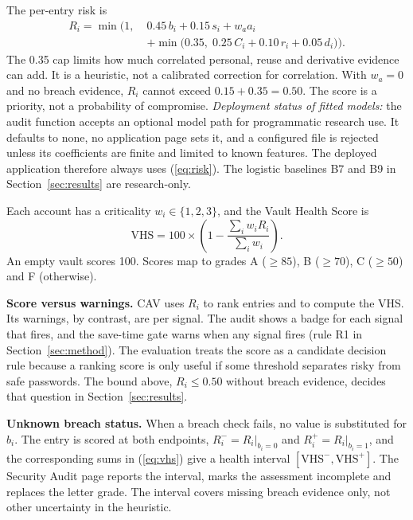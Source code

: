 \documentclass[preprint,12pt]{elsarticle}
\begin{document}
The per-entry risk is
\begin{align}
R_i=\min\!\Big(1,\;&0.45\,b_i+0.15\,s_i+w_a a_i\nonumber\\
&+\min\big(0.35,\;0.25\,C_i+0.10\,r_i+0.05\,d_i\big)\Big).
\label{eq:risk}
\end{align}
The 0.35 cap limits how much correlated personal, reuse and derivative evidence can add. It is a heuristic, not a calibrated correction for correlation. With $w_a=0$ and no breach evidence, $R_i$ cannot exceed $0.15+0.35=0.50$. The score is a priority, not a probability of compromise. \emph{Deployment status of fitted models:} the audit function accepts an optional model path for programmatic research use. It defaults to none, no application page sets it, and a configured file is rejected unless its coefficients are finite and limited to known features. The deployed application therefore always uses (\ref{eq:risk}). The logistic baselines B7 and B9 in Section~\ref{sec:results} are research-only.

Each account has a criticality $w_i\in\{1,2,3\}$, and the Vault Health Score is
\begin{equation}
\mathrm{VHS}=100\times\left(1-\frac{\sum_i w_i R_i}{\sum_i w_i}\right).
\label{eq:vhs}
\end{equation}
An empty vault scores 100. Scores map to grades A ($\geq 85$), B ($\geq 70$), C ($\geq 50$) and F (otherwise).

\textbf{Score versus warnings.} CAV uses $R_i$ to rank entries and to compute the VHS. Its warnings, by contrast, are per signal. The audit shows a badge for each signal that fires, and the save-time gate warns when any signal fires (rule R1 in Section~\ref{sec:method}). The evaluation treats the score as a candidate decision rule because a ranking score is only useful if some threshold separates risky from safe passwords. The bound above, $R_i\leq 0.50$ without breach evidence, decides that question in Section~\ref{sec:results}.

\textbf{Unknown breach status.} When a breach check fails, no value is substituted for $b_i$. The entry is scored at both endpoints, $R_i^{-}=R_i|_{b_i=0}$ and $R_i^{+}=R_i|_{b_i=1}$, and the corresponding sums in (\ref{eq:vhs}) give a health interval $[\mathrm{VHS}^{-},\mathrm{VHS}^{+}]$. The Security Audit page reports the interval, marks the assessment incomplete and replaces the letter grade. The interval covers missing breach evidence only, not other uncertainty in the heuristic.
\end{document}
